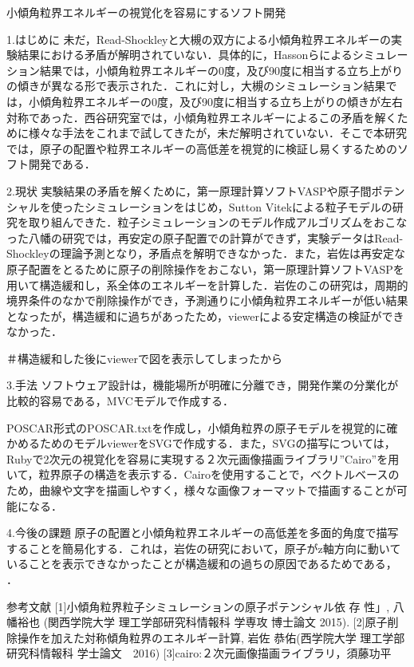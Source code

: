 \documentclass[a4j,twocolumn]{jsarticle}
\begin{document}
小傾角粒界エネルギーの視覚化を容易にするソフト開発

1.はじめに
未だ，Read-Shockleyと大槻の双方による小傾角粒界エネルギーの実験結果における矛盾が解明されていない．具体的に，Hassonらによるシミュレーション結果では，小傾角粒界エネルギーの0度，及び90度に相当する立ち上がりの傾きが異なる形で表示された．これに対し，大槻のシミュレーション結果では，小傾角粒界エネルギーの0度，及び90度に相当する立ち上がりの傾きが左右対称であった．西谷研究室では，小傾角粒界エネルギーによるこの矛盾を解くために様々な手法をこれまで試してきたが，未だ解明されていない．そこで本研究では，原子の配置や粒界エネルギーの高低差を視覚的に検証し易くするためのソフト開発である．

2.現状
実験結果の矛盾を解くために，第一原理計算ソフトVASPや原子間ポテンシャルを使ったシミュレーションをはじめ，Sutton Vitekによる粒子モデルの研究を取り組んできた．粒子シミュレーションのモデル作成アルゴリズムをおこなった八幡の研究では，再安定の原子配置での計算ができず，実験データはRead-Shockleyの理論予測となり，矛盾点を解明できなかった．また，岩佐は再安定な原子配置をとるために原子の削除操作をおこない，第一原理計算ソフトVASPを用いて構造緩和し，系全体のエネルギーを計算した．岩佐のこの研究は，周期的境界条件のなかで削除操作ができ，予測通りに小傾角粒界エネルギーが低い結果となったが，構造緩和に過ちがあったため，viewerによる安定構造の検証ができなかった．

＃構造緩和した後にviewerで図を表示してしまったから

3.手法
ソフトウェア設計は，機能場所が明確に分離でき，開発作業の分業化が比較的容易である，MVCモデルで作成する．

POSCAR形式のPOSCAR.txtを作成し，小傾角粒界の原子モデルを視覚的に確かめるためのモデルviewerをSVGで作成する．また，SVGの描写については，Rubyで2次元の視覚化を容易に実現する２次元画像描画ライブラリ”Cairo”を用いて，粒界原子の構造を表示する．Cairoを使用することで，ベクトルベースのため，曲線や文字を描画しやすく，様々な画像フォーマットで描画することが可能になる．



4.今後の課題
原子の配置と小傾角粒界エネルギーの高低差を多面的角度で描写することを簡易化する．これは，岩佐の研究において，原子がz軸方向に動いていることを表示できなかったことが構造緩和の過ちの原因であるためである，
．

参考文献
[1]小傾角粒界粒子シミュレーションの原子ポテンシャル依 存    性」, 八幡裕也 (関西学院大学 理工学部研究科情報科 学専攻 博士論文 2015).
[2]原子削除操作を加えた対称傾角粒界のエネルギー計算, 岩佐 恭佑(西学院大学 理工学部研究科情報科 学士論文　2016) 
[3]cairo:２次元画像描画ライブラリ，須藤功平
\end{document}
